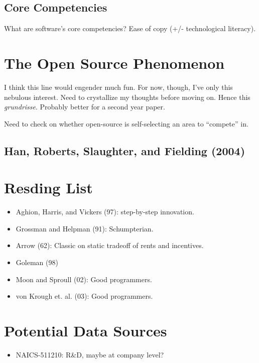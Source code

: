 \documentclass[11pt]{article}
\begin{document}
\subsection{Core Competencies}
\label{sub:core_competencies}
  What are software's core competencies?  Ease of copy (+/- technological literacy).



\section{The Open Source Phenomenon}
\label{sec:the_open_source_phenomenon}

I think this line would engender much fun.  For now, though, I've only this nebulous interest.  Need to crystallize my thoughts before moving on.  Hence this \emph{grundrisse}.  Probably better for a second year paper.

Need to check on whether open-source is self-selecting an area to ``compete'' in.

\subsection{Han, Roberts, Slaughter, and Fielding (2004)}
\label{sub:han_roberts_slaughter_and_fielding_}

  

\section{Resding List}
\label{sec:resding_list}

\begin{itemize}
    \item Aghion, Harris, and Vickers (97): step-by-step innovation.
    \item Grossman and Helpman (91): Schumpterian.
    \item Arrow (62): Classic on static tradeoff of rents and incentives.
    \item Goleman (98)
    \item Moon and Sproull (02): Good programmers.
    \item von Krough et. al. (03): Good programmers.
\end{itemize}

\section{Potential Data Sources}
\label{sec:potential_data_sources}

\begin{itemize}
    \item NAICS-511210: R\&D, maybe at company level?
\end{itemize}
\end{document}
